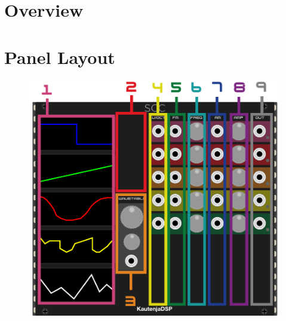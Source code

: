 \documentclass[12pt,letter]{article}
\begin{document}

\section*{Overview}




\clearpage
\section*{Panel Layout}

\begin{figure}[!htp]
\centering
\includegraphics{SCC-Manual}
\end{figure}
\end{document}
